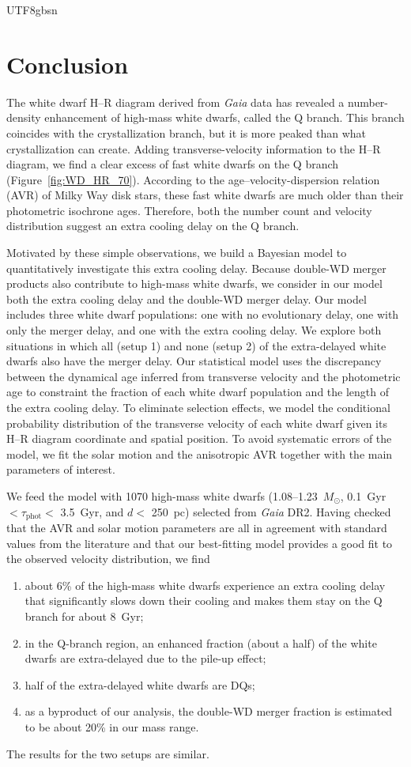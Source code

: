 \documentclass[twocolumn, times, trackchanges]{aastex63_bren}
\begin{document}
\begin{CJK*}{UTF8}{gbsn}
\section{Conclusion}
\label{sec:conclusion}

The white dwarf H--R diagram derived from {\it Gaia} data has revealed a number-density enhancement of high-mass white dwarfs, called the Q branch. This branch coincides with the crystallization branch, but it is more peaked than what crystallization can create. Adding transverse-velocity information to the H--R diagram, we find a clear excess of fast white dwarfs on the Q branch (Figure~\ref{fig:WD_HR_70}). According to the age--velocity-dispersion relation (AVR) of Milky Way disk stars, these fast white dwarfs are much older than their photometric isochrone ages. Therefore, both the number count and velocity distribution suggest an extra cooling delay on the Q branch.

Motivated by these simple observations, we build a Bayesian model to quantitatively investigate this extra cooling delay. Because double-WD merger products also contribute to high-mass white dwarfs, we consider in our model both the extra cooling delay and the double-WD merger delay. Our model includes three white dwarf populations: one with no evolutionary delay, one with only the merger delay, and one with the extra cooling delay. We explore both situations in which all (setup 1) and none (setup 2) of the extra-delayed white dwarfs also have the merger delay. Our statistical model uses the discrepancy between the dynamical age inferred from transverse velocity and the photometric age to constraint the fraction of each white dwarf population and the length of the extra cooling delay. To eliminate selection effects, we model the conditional probability distribution of the transverse velocity of each white dwarf given its H--R diagram coordinate and spatial position. To avoid systematic errors of the model, we fit the solar motion and the anisotropic AVR together with the main parameters of interest.

We feed the model with 1070 high-mass white dwarfs (1.08--1.23~$M_\odot$, 0.1~Gyr $<\tau_\text{phot}<$ 3.5~Gyr, and $d<$ 250~pc) selected from {\it Gaia} DR2. Having checked that the AVR and solar motion parameters are all in agreement with standard values from the literature and that our best-fitting model provides a good fit to the observed velocity distribution, we find
\begin{enumerate}
    \item about 6\% of the high-mass white dwarfs experience an extra cooling delay that significantly slows down their cooling and makes them stay on the Q branch for about 8~Gyr;
    \item in the Q-branch region, an enhanced fraction (about a half) of the white dwarfs are extra-delayed due to the pile-up effect;
    \item half of the extra-delayed white dwarfs are DQs;
    \item as a byproduct of our analysis, the double-WD merger fraction is estimated to be about 20\% in our mass range.
\end{enumerate}
The results for the two setups are similar.


\end{CJK*}
\end{document}
